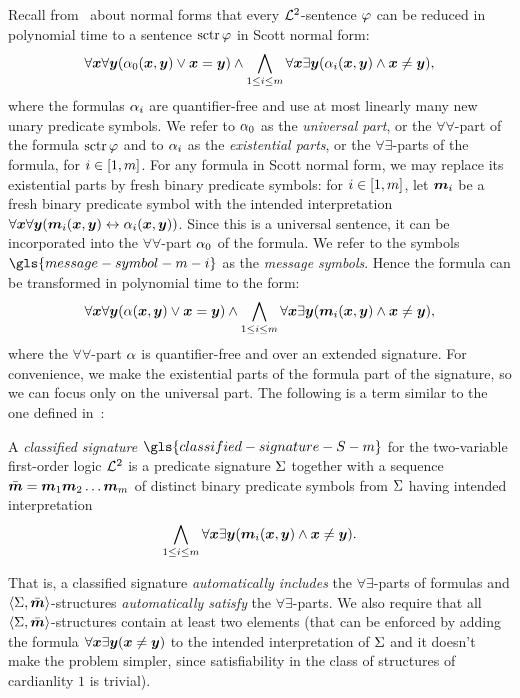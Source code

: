 Recall from~ about normal forms that every $\mathcal{L}^{2}$-sentence
$\varphi$ can be reduced in polynomial time to a sentence $\operatorname{sctr}\varphi$ in Scott
normal form:
\[
  \forall\bm{x}\forall\bm{y} (\alpha_{0}(\bm{x},\bm{y}) \lor \bm{x} = \bm{y}) \land
  \bigwedge_{1 \leq i \leq m} \forall\bm{x}\exists\bm{y}(
  \alpha_{i}(\bm{x},\bm{y}) \land \bm{x} \neq \bm{y}),
\]
where the formulas $\alpha_{i}$ are quantifier-free and use at most linearly many
new unary predicate symbols. We refer to $\alpha_{0}$ as the \emph{universal part},
or the $\forall\forall$-part of the formula $\operatorname{sctr}\varphi$ and to $\alpha_{i}$ as
the \emph{existential parts}, or the $\forall\exists$-parts of the formula,
for $i \in [1,m]$.
For any formula in Scott normal form, we may replace its existential parts
by fresh binary predicate symbols: for $i \in [1,m]$, let $\bm{m}_{i}$ be a
fresh binary predicate symbol with the intended interpretation
$\forall\bm{x}\forall\bm{y} (\bm{m}_{i}(\bm{x},\bm{y}) \leftrightarrow \alpha_{i}(\bm{x},\bm{y}))$.
Since this is a universal sentence, it can be incorporated into the
$\forall\forall$-part $\alpha_{0}$ of the formula.
We refer to the symbols $\gls{message-symbol-m-i}$ as the \emph{message
symbols}.
Hence the formula can be transformed in polynomial time to the form:
\begin{equation}\label{eq:twovar-msg-nf}
  \forall\xx\forall\yy (\falp(\xx,\yy) \lor \xx = \yy) \land
  \bigwedge_{1 \leq \ii \leq \nm} \forall\xx\exists\yy
  (\smm\ii(\xx,\yy) \land \xx \neq \yy),
\end{equation}
where the $\forall\forall$-part $\alpha$ is quantifier-free and over an extended
signature. For convenience, we make the existential parts of the formula part of
the signature, so we can focus only on the universal part. The following is a
term similar to the one defined in~\cite{MALQ:MALQ201400102}:
\begin{definition}
A \emph{classified signature} $\gls{classified-signature-S-m}$ for the
two-variable first-order logic $\mathcal{L}^{2}$ is a predicate signature $\mathrm{\Sigma}$ together
with a sequence $\sms = \smm1\smm2\dots\smm\nm$ of distinct binary predicate
symbols from $\mathrm{\Sigma}$ having intended interpretation
\begin{equation}\label{eq:twovar-ms-iinter}
  \bigwedge_{1 \leq \ii \leq \nm} \forall\xx\exists\yy 
  (\smm\ii(\xx,\yy) \land \xx \neq \yy).
\end{equation}
\end{definition}
That is, a classified signature \emph{automatically includes} the
$\forall\exists$-parts of formulas and $\left\langle \mathrm{\Sigma},\bar{\bm{m}} \right\rangle$-structures
\emph{automatically satisfy} the $\forall\exists$-parts. We also require that
all $\left\langle \mathrm{\Sigma},\bar{\bm{m}} \right\rangle$-structures contain at least two elements (that can be
enforced by adding the formula $\forall\bm{x}\exists\bm{y}(\bm{x}\neq\bm{y})$ to the
intended interpretation of $\mathrm{\Sigma}$ and it doesn't make the problem simpler,
since satisfiability in the class of structures of cardianlity $1$ is trivial).

